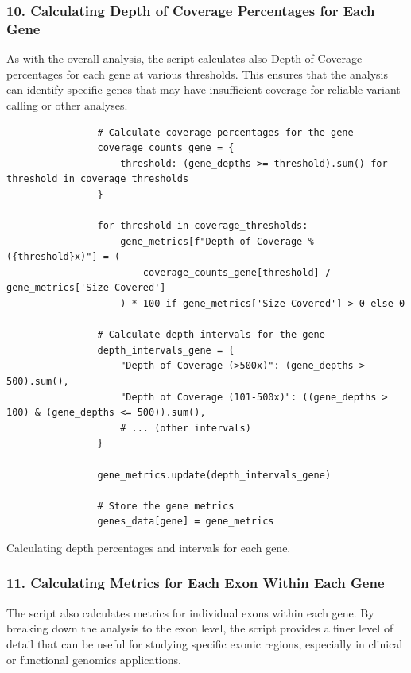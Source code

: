 \subsubsection{\textbf{10. Calculating Depth of Coverage Percentages for Each Gene}}

As with the overall analysis, the script calculates also Depth of Coverage percentages for each gene at various thresholds. This ensures that the analysis can identify specific genes that may have insufficient coverage for reliable variant calling or other analyses.

\begin{longlisting}
\begin{verbatim}
                # Calculate coverage percentages for the gene
                coverage_counts_gene = {
                    threshold: (gene_depths >= threshold).sum() for threshold in coverage_thresholds
                }

                for threshold in coverage_thresholds:
                    gene_metrics[f"Depth of Coverage % ({threshold}x)"] = (
                        coverage_counts_gene[threshold] / gene_metrics['Size Covered']
                    ) * 100 if gene_metrics['Size Covered'] > 0 else 0

                # Calculate depth intervals for the gene
                depth_intervals_gene = {
                    "Depth of Coverage (>500x)": (gene_depths > 500).sum(),
                    "Depth of Coverage (101-500x)": ((gene_depths > 100) & (gene_depths <= 500)).sum(),
                    # ... (other intervals)
                }

                gene_metrics.update(depth_intervals_gene)

                # Store the gene metrics
                genes_data[gene] = gene_metrics
\end{verbatim}
\caption{Calculating depth percentages and intervals for each gene.}
\label{lbl:metrics_gene_coverage}
\end{longlisting}


\subsubsection{\textbf{11. Calculating Metrics for Each Exon Within Each Gene}}

The script also calculates metrics for individual exons within each gene. By breaking down the analysis to the exon level, the script provides a finer level of detail that can be useful for studying specific exonic regions, especially in clinical or functional genomics applications.

